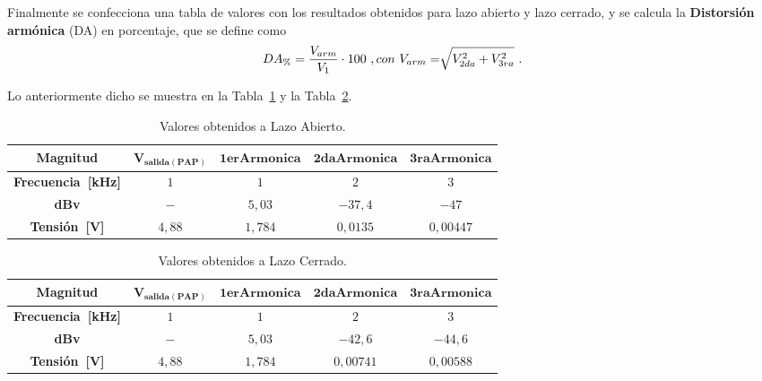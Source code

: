       Finalmente se confecciona una tabla de valores con los resultados obtenidos para lazo abierto y 
      lazo cerrado, y se calcula la 
      \textbf{Distorsión armónica} (DA) en porcentaje, que se define como 
        \begin{equation}
          DA_{\%}= \dfrac{V_{arm}}{V_{1}} \cdot 100~, \vspace{10pt} con~V_{arm}=\sqrt[]{V_{2da}^2+V_{3ra}^2}~.
          \label{eqn:DistorsionArmonica}
        \end{equation}
      
      Lo anteriormente dicho se muestra en la 
      Tabla~\ref{tab:Exp7DistArmLA} y la Tabla~\ref{tab:Exp7DistArmLC}.

      \begin{table}[H]
      \centering
        \begin{tabular}{ccccc} \hline \hline
          \textbf{Magnitud}            &   $\mathbf{V_{salida(PAP)}}$  &  $\mathbf{1erArmonica}$  & $\mathbf{2daArmonica}$  & $\mathbf{3raArmonica}$\\ \hline
          \textbf{Frecuencia~[kHz]}    &   $1$                         &    $1$                   &   $2$                   & $3$ \\
          \textbf{dBv}                 &   $-$                         &    $5,03$                &   $-37,4$                & $-47$ \\
          \textbf{Tensión~[V]}         &   $4,88$                      &    $1,784$             &   $0,0135$              & $0,00447$\\ \hline \hline
          \end{tabular}
          \caption{Valores obtenidos a Lazo Abierto.}
          \label{tab:Exp7DistArmLA}
      \end{table}

     \begin{table}[H]
      \centering
        \begin{tabular}{ccccc} \hline \hline
          \textbf{Magnitud}            &   $\mathbf{V_{salida(PAP)}}$  &  $\mathbf{1erArmonica}$  & $\mathbf{2daArmonica}$  & $\mathbf{3raArmonica}$\\ \hline
          \textbf{Frecuencia~[kHz]}    &   $1$                         &    $1$                   &   $2$                   & $3$ \\
          \textbf{dBv}                 &   $-$                         &    $5,03$                &   $-42,6$                & $-44,6$ \\
          \textbf{Tensión~[V]}         &   $4,88$                      &    $1,784$             &   $0,00741$              & $0,00588$\\ \hline \hline
          \end{tabular}
          \caption{Valores obtenidos a Lazo Cerrado.}
          \label{tab:Exp7DistArmLC}
      \end{table}

